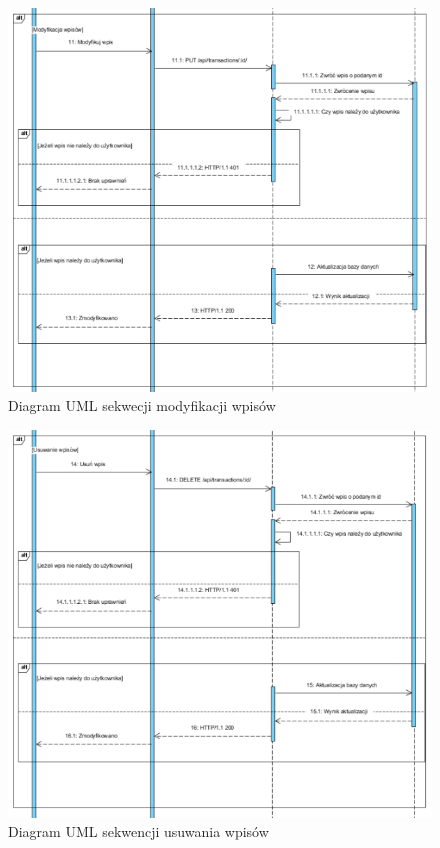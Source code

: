 \documentclass{article}
\begin{document}
	\begin{figure}[H]
		\hspace*{-1.5cm}
		\includegraphics[scale=0.9]{assets/sq6.png}
		\caption[]{Diagram UML sekwecji modyfikacji wpisów}
		\label{fig:umlmod}
	\end{figure}
	\begin{figure}[H]

		\hspace*{-1.5cm}
		\includegraphics[scale=0.9]{assets/sq7.png}
		\caption[]{Diagram UML sekwencji usuwania wpisów}
		\label{fig:umlusu}
	\end{figure}
\end{document}

